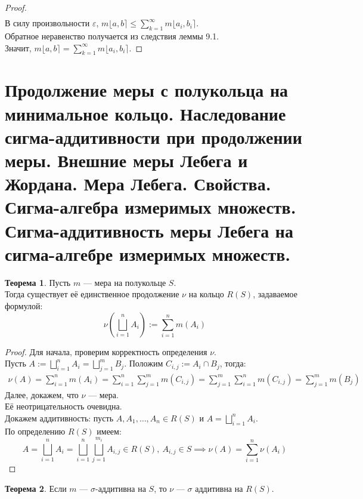 \documentclass[11pt,a4paper]{report}
\def\eps{\varepsilon}
\theoremstyle{definition}
\theoremstyle{definition}
\newtheorem{theorem}{Теорема}[section]
\theoremstyle{definition}
\begin{document}
\begin{proof}
\begin{gather*}
		\end{gather*}
		В силу произвольности $ \eps $, $ m\lfloor a, b \rceil \le \sum_{k=1}^{\infty}{m\lfloor a_{i}, b_{i} \rceil } $.\\
		Обратное неравенство получается из следствия леммы 9.1.\\
		Значит, $ m\lfloor a, b \rceil = \sum_{k=1}^{\infty}{m\lfloor a_{i}, b_{i} \rceil } $.
	\end{proof}
	\section{Продолжение меры с полукольца на минимальное кольцо. Наследование сигма-аддитивности при продолжении меры. Внешние меры Лебега и Жордана. Мера Лебега. Свойства. Сигма-алгебра измеримых множеств. Сигма-аддитивность меры Лебега на сигма-алгебре измеримых множеств.}
	\begin{theorem}
		Пусть $ m $ — мера на полукольце $ S $.\\ 
		Тогда существует её единственное продолжение $ \nu $ на кольцо $ R(S) $, задаваемое формулой:
		\[ \nu\left (\bigsqcup_{i=1}^{n}{A_{i}}\right ) := \sum_{i=1}^{n}{m(A_{i})} \]
	\end{theorem}
	\begin{proof}
		Для начала, проверим корректность определения $ \nu $.\\
		Пусть $ A := \bigsqcup_{i=1}^{n}{A_{i}} = \bigsqcup_{j=1}^{m}{B_{j}} $. Положим $ C_{i, j} := A_{i} \cap B_{j} $, тогда: 
		\begin{gather*}
			\nu(A) = \sum_{i=1}^{n}{m(A_{i})} =   \sum_{i=1}^{n}{\sum_{j=1}^{m}{m(C_{i, j})}} = \sum_{j=1}^{m}{\sum_{i=1}^{n}{m(C_{i, j})}} = \sum_{j=1}^{m}{m(B_{j})}
		\end{gather*}
		Далее, докажем, что $ \nu $ — мера.\\
		Её неотрицательность очевидна.\\
		Докажем аддитивность: пусть $ A, A_{1}, \dots, A_{n} \in R(S) $ и $ A = \bigsqcup_{i=1}^{n}{A_{i}} $.\\
		По определению $ R(S) $ имеем:
	 \[ A = \bigsqcup_{i=1}^{n}{A_{i}} = \bigsqcup_{i=1}^{n}{\bigsqcup_{j=1}^{m_{i}}{A_{i, j}}} \in R(S),\ A_{i, j} \in S \implies \nu(A) = \sum_{i=1}^{n}{\nu(A_{i})} \]
	\end{proof}
	\begin{theorem}
		 Если $ m $ — $ \sigma $-аддитивна на $ S $, то $ \nu $ — $ \sigma $ аддитивна на $ R(S) $.
	\end{theorem}
\end{document}
